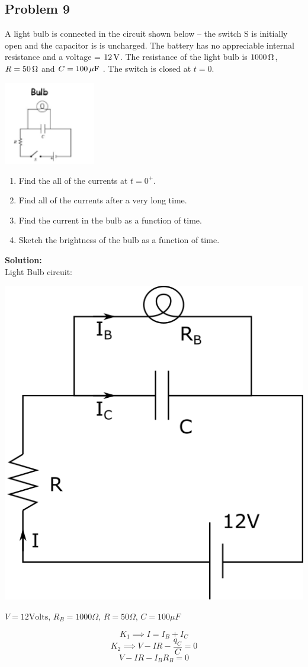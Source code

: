 \subsection*{Problem 9}
A light bulb is connected in the circuit shown below -- the switch S is initially open and the
capacitor is is uncharged. The battery has no appreciable internal resistance and a voltage = $12\,\mathrm{V}$. The
resistance of the light bulb is $1000 \,\mathrm{\Omega}$, $R = 50\,\mathrm{\Omega}$ and $C = 100\,\mathrm{\mu F}$ . The switch is closed at $t=0$.\\
\centerline{\includegraphics[width=0.3\textwidth]{Images/P9img1.png}}
\begin{enumerate}
    \item Find the all of the currents at $t=0^+$.
    \item Find all of the currents after a very long time.
    \item Find the current in the bulb as a function of time.
    \item Sketch the brightness of the bulb as a function of time.
\end{enumerate}

\textbf{Solution:}\\
Light Bulb circuit:
\vspace{5mm}

\includegraphics[width=0.35\linewidth]{Images/P9img2.png}

$V=12\textrm{Volts}$, $R_B=1000\Omega$, $R=50\Omega$, $C=100\mu F$


$$K_1 \implies I = I_B+I_C$$
$$K_2 \implies V-IR-\frac{q_C}{C}=0$$
$$V-IR-I_BR_B=0$$

